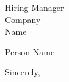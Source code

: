 \documentclass{letter}
\begin{document}
\begin{letter}{%
Hiring Manager \\
Company \\
Name}

\longindentation=0pt

\opening{Person Name}

\closing{Sincerely,}

\end{letter}
\end{document}
